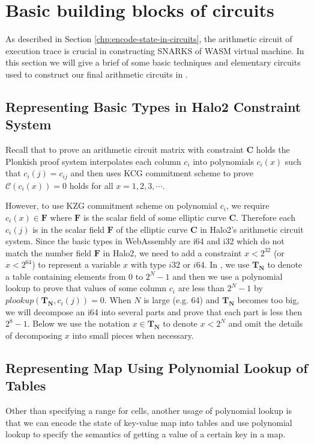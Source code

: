 \section{Basic building blocks of \zkwasm circuits}
\label{chp:build-blocks}
As described in Section \ref{chp:encode-state-in-circuits}, the arithmetic circuit of execution trace is crucial in constructing SNARKS of WASM virtual machine. In this section we will give a brief of some basic techniques and elementary circuits used to construct our final arithmetic circuits in \zkwasm.



\subsection{Representing Basic Types in Halo2 Constraint System}
Recall that to prove an arithmetic circuit matrix with constraint $\mathbf{C}$ holds the Plonkish proof system interpolates each column $c_i$ into polynomials $c_i(x)$ such that $c_i(j) = c_{ij}$ and then uses KCG commitment scheme to prove $\mathcal{C}(c_i(x)) = 0$ holds for all $x=1,2,3,\cdots$. 

However, to use KZG commitment scheme on polynomial $c_i$, we require $c_i(x) \in \mathbf{F}$ where $\mathbf{F}$ is the scalar field of some elliptic curve $\mathbf{C}$. Therefore each $c_i(j)$ is in the scalar field $\mathbf{F}$ of the elliptic curve $\mathbf{C}$ in Halo2's arithmetic circuit system. Since the basic types in WebAssembly are i64 and i32 which do not match the number field $\mathbf{F}$ in Halo2, we need to add a constraint $x<2^{32}$ (or $x< 2^{64}$) to represent a variable $x$ with type $i32$ or $i64$. In \zkwasm, we use $\mathbf{T_N}$ to denote a table containing elements from $0$ to $2^N-1$ and then we use a polynomial lookup to prove that values of some column $c_i$ are less than $2^N-1$ by $plookup(\mathbf{T_N}, c_i(j)) = 0$. When $N$ is large (e.g. 64) and $\mathbf{T_N}$ becomes too big, we will decompose an i64 into several parts and prove that each part is less then $2^8-1$. Below we use the notation $x \in \mathbf{T_N}$ to denote $x < 2^N$ and omit the details of decomposing $x$ into small pieces when necessary.

\subsection{Representing Map Using Polynomial Lookup of Tables}
\label{chp:map-repr}
Other than specifying a range for cells, another usage of polynomial lookup is that we can encode the state of key-value map into tables and use polynomial lookup to specify the semantics of getting a value of a certain key in a map. 

